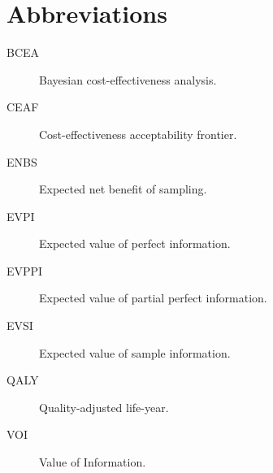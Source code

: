 \section{Abbreviations}\label{sec:abbreviations}

\begin{description}
  \item[BCEA] Bayesian cost-effectiveness analysis.
  \item[CEAF] Cost-effectiveness acceptability frontier.
  \item[ENBS] Expected net benefit of sampling.
  \item[EVPI] Expected value of perfect information.
  \item[EVPPI] Expected value of partial perfect information.
  \item[EVSI] Expected value of sample information.
  \item[QALY] Quality-adjusted life-year.
  \item[VOI] Value of Information\@.
\end{description}
